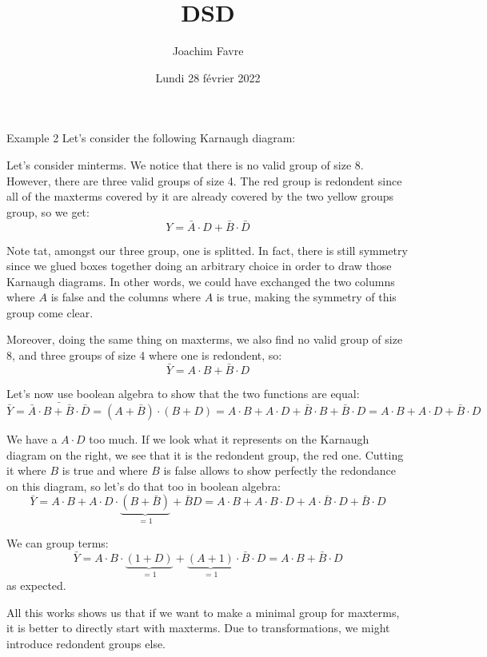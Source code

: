 \documentclass[a4paper]{article}
\title{DSD}
\author{Joachim Favre}
\date{Lundi 28 février 2022}
\begin{document}
\maketitle


\begin{parag}{Example 2}
    Let's consider the following Karnaugh diagram:

    Let's consider minterms. We notice that there is no valid group of size 8. However, there are three valid groups of size 4. The red group is redondent since all of the maxterms covered by it are already covered by the two yellow groups group, so we get: 
    \[Y = \bar{A} \cdot D + \bar{B} \cdot \bar{D}\]

    Note tat, amongst our three group, one is splitted. In fact, there is still symmetry since we glued boxes together doing an arbitrary choice in order to draw those Karnaugh diagrams. In other words, we could have exchanged the two columns where $A$ is false and the columns where $A$ is true, making the symmetry of this group come clear.

    Moreover, doing the same thing on maxterms, we also find no valid group of size 8, and three groups of size 4 where one is redondent, so: 
    \[\bar{Y} = A\cdot B + \bar{B} \cdot D\]
    

    Let's now use boolean algebra to show that the two functions are equal: 
    \[\bar{Y} = \bar{\bar{A} \cdot B + \bar{B} \cdot\bar{D}} = \left(A + \bar{B}\right)\cdot\left(B + D\right) = A\cdot B + A\cdot D + \bar{B}\cdot B + \bar{B}\cdot D = A\cdot B + A\cdot D + \bar{B}\cdot D\]
    
    We have a $A\cdot D$ too much. If we look what it represents on the Karnaugh diagram on the right, we see that it is the redondent group, the red one. Cutting it where $B$ is true and where $B$ is false allows to show perfectly the redondance on this diagram, so let's do that too in boolean algebra: 
    \[\bar{Y} = A\cdot B + A\cdot D\cdot \underbrace{\left(B + \bar{B}\right)}_{= 1} + \bar{B} D = A\cdot B + A\cdot B\cdot D + A\cdot \bar{B}\cdot D + \bar{B} \cdot D\]
    
    We can group terms:
    \[\bar{Y} = A\cdot B\cdot \underbrace{\left(1 + D\right)}_{= 1} + \underbrace{\left(A + 1\right)}_{=1}\cdot\bar{B} \cdot D = A\cdot B + \bar{B}\cdot D\]
    as expected.

    All this works shows us that if we want to make a minimal group for maxterms, it is better to directly start with maxterms. Due to transformations, we might introduce redondent groups else.
\end{parag}
\end{document}
